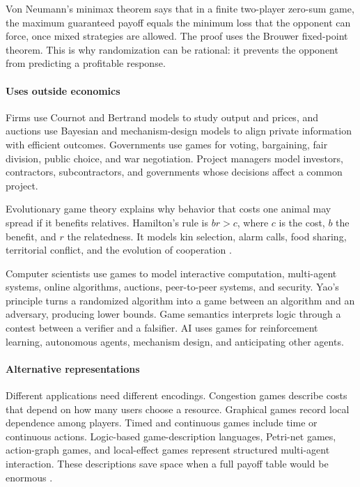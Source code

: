 Von Neumann's minimax theorem says that in a finite two-player zero-sum game, the maximum guaranteed payoff equals the minimum loss that the opponent can force, once mixed strategies are allowed. The proof uses the Brouwer fixed-point theorem. This is why randomization can be rational: it prevents the opponent from predicting a profitable response.

\paragraph{Uses outside economics}
Firms use Cournot and Bertrand models to study output and prices, and auctions use Bayesian and mechanism-design models to align private information with efficient outcomes. Governments use games for voting, bargaining, fair division, public choice, and war negotiation. Project managers model investors, contractors, subcontractors, and governments whose decisions affect a common project.

Evolutionary game theory explains why behavior that costs one animal may spread if it benefits relatives. Hamilton's rule is $br>c$, where $c$ is the cost, $b$ the benefit, and $r$ the relatedness. It models kin selection, alarm calls, food sharing, territorial conflict, and the evolution of cooperation \cite{game_theory_ref4}.

Computer scientists use games to model interactive computation, multi-agent systems, online algorithms, auctions, peer-to-peer systems, and security. Yao's principle turns a randomized algorithm into a game between an algorithm and an adversary, producing lower bounds. Game semantics interprets logic through a contest between a verifier and a falsifier. AI uses games for reinforcement learning, autonomous agents, mechanism design, and anticipating other agents.

\paragraph{Alternative representations}
Different applications need different encodings. Congestion games describe costs that depend on how many users choose a resource. Graphical games record local dependence among players. Timed and continuous games include time or continuous actions. Logic-based game-description languages, Petri-net games, action-graph games, and local-effect games represent structured multi-agent interaction. These descriptions save space when a full payoff table would be enormous \cite{game_theory_ref5}.

